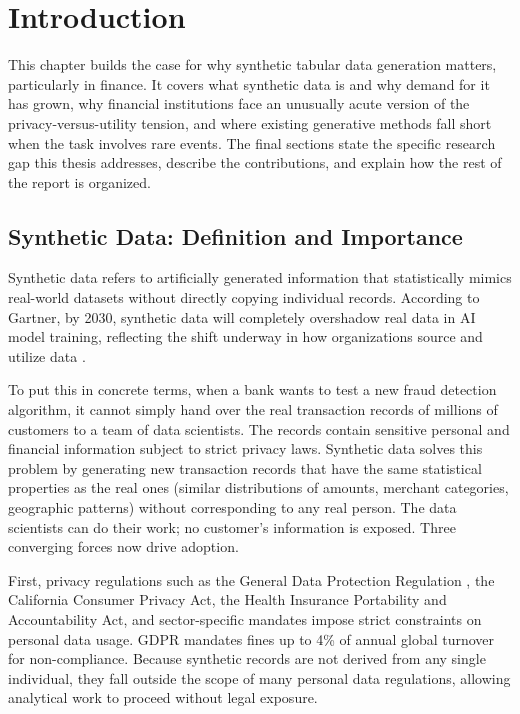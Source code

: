 \chapter{Introduction}

This chapter builds the case for why synthetic tabular data generation matters, particularly in finance. It covers what synthetic data is and why demand for it has grown, why financial institutions face an unusually acute version of the privacy-versus-utility tension, and where existing generative methods fall short when the task involves rare events. The final sections state the specific research gap this thesis addresses, describe the contributions, and explain how the rest of the report is organized.

\section{Synthetic Data: Definition and Importance}

Synthetic data refers to artificially generated information that statistically mimics real-world datasets without directly copying individual records. According to Gartner, by 2030, synthetic data will completely overshadow real data in AI model training, reflecting the shift underway in how organizations source and utilize data \cite{figueira2022survey}.

To put this in concrete terms, when a bank wants to test a new fraud detection algorithm, it cannot simply hand over the real transaction records of millions of customers to a team of data scientists. The records contain sensitive personal and financial information subject to strict privacy laws. Synthetic data solves this problem by generating new transaction records that have the same statistical properties as the real ones (similar distributions of amounts, merchant categories, geographic patterns) without corresponding to any real person. The data scientists can do their work; no customer's information is exposed. Three converging forces now drive adoption.

First, privacy regulations such as the General Data Protection Regulation \cite{gdpr2016regulation}, the California Consumer Privacy Act, the Health Insurance Portability and Accountability Act, and sector-specific mandates impose strict constraints on personal data usage. GDPR mandates fines up to 4\% of annual global turnover for non-compliance. Because synthetic records are not derived from any single individual, they fall outside the scope of many personal data regulations, allowing analytical work to proceed without legal exposure.

